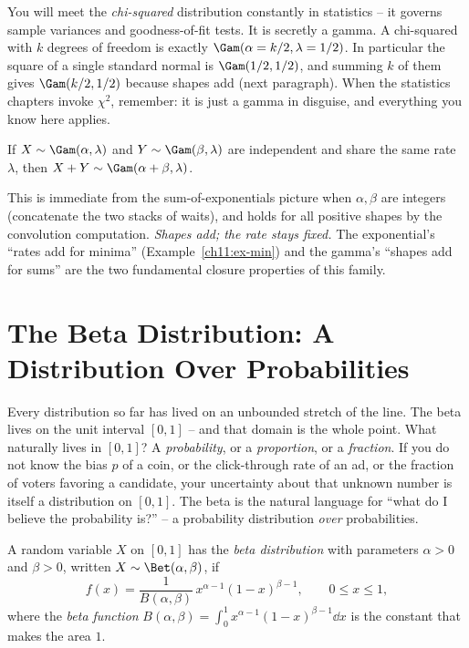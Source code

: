 \begin{connectionbox}
You will meet the \emph{chi-squared} distribution constantly in statistics --
it governs sample variances and goodness-of-fit tests. It is secretly a gamma.
A chi-squared with $k$ degrees of freedom is exactly $\Gam(\alpha=k/2,
\lambda=1/2)$. In particular the square of a single standard normal is
$\Gam(1/2,1/2)$, and summing $k$ of them gives $\Gam(k/2,1/2)$ because shapes
add (next paragraph). When the statistics chapters invoke $\chi^2$, remember:
it is just a gamma in disguise, and everything you know here applies.
\end{connectionbox}

\begin{proposition}
\label{ch11:prop-gamma-add}
If $X\sim\Gam(\alpha,\lambda)$ and $Y\sim\Gam(\beta,\lambda)$ are independent
and share the same rate $\lambda$, then $X+Y\sim\Gam(\alpha+\beta,\lambda)$.
\end{proposition}

This is immediate from the sum-of-exponentials picture when $\alpha,\beta$ are
integers (concatenate the two stacks of waits), and holds for all positive
shapes by the convolution computation. \emph{Shapes add; the rate stays fixed.}
The exponential's ``rates add for minima'' (Example~\ref{ch11:ex-min}) and the
gamma's ``shapes add for sums'' are the two fundamental closure properties of
this family.

\section{The Beta Distribution: A Distribution Over Probabilities}
\label{ch11:beta}

\begin{intuitionbox}
Every distribution so far has lived on an unbounded stretch of the line. The
beta lives on the unit interval $[0,1]$ -- and that domain is the whole point.
What naturally lives in $[0,1]$? A \emph{probability}, or a \emph{proportion}, or
a \emph{fraction}. If you do not know the bias $p$ of a coin, or the click-through
rate of an ad, or the fraction of voters favoring a candidate, your uncertainty
about that unknown number is itself a distribution on $[0,1]$. The beta is the
natural language for ``what do I believe the probability is?'' -- a probability
distribution \emph{over} probabilities.
\end{intuitionbox}

\begin{definition}
\label{ch11:def-beta}
A random variable $X$ on $[0,1]$ has the \emph{beta distribution} with parameters
$\alpha > 0$ and $\beta > 0$, written $X\sim\Bet(\alpha,\beta)$, if
\[
  f(x) = \frac{1}{B(\alpha,\beta)}\,x^{\alpha-1}(1-x)^{\beta-1},
  \qquad 0 \le x \le 1,
\]
where the \emph{beta function} $B(\alpha,\beta) = \int_0^1
x^{\alpha-1}(1-x)^{\beta-1}\dd x$ is the constant that makes the area $1$.
\end{definition}

